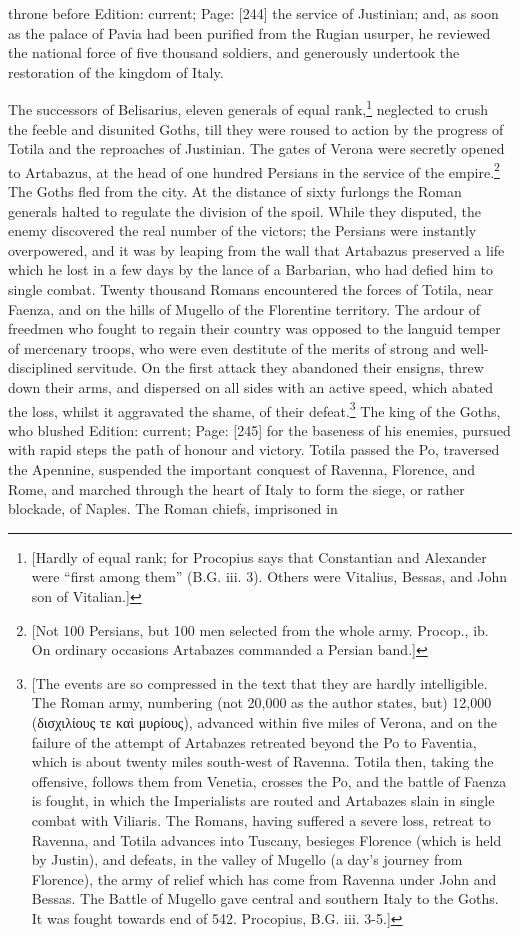 throne before Edition: current; Page: [244] the service of Justinian; and, as soon as the palace of Pavia had been purified from the Rugian usurper, he reviewed the national force of five thousand soldiers, and generously undertook the restoration of the kingdom of Italy.

The successors of Belisarius, eleven generals of equal rank,\footnote{[Hardly of equal rank; for Procopius says that Constantian and Alexander were \texthebrew{“}first among them\texthebrew{}” (B.G. iii. 3). Others were Vitalius, Bessas, and John son of Vitalian.]} neglected to crush the feeble and disunited Goths, till they were roused to action by the progress of Totila and the reproaches of Justinian. The gates of Verona were secretly opened to Artabazus, at the head of one hundred Persians in the service of the empire.\footnote{[Not 100 Persians, but 100 men selected from the whole army. Procop., ib. On ordinary occasions Artabazes commanded a Persian band.]} The Goths fled from the city. At the distance of sixty furlongs the Roman generals halted to regulate the division of the spoil. While they disputed, the enemy discovered the real number of the victors; the Persians were instantly overpowered, and it was by leaping from the wall that Artabazus preserved a life which he lost in a few days by the lance of a Barbarian, who had defied him to single combat. Twenty thousand Romans encountered the forces of Totila, near Faenza, and on the hills of Mugello of the Florentine territory. The ardour of freedmen who fought to regain their country was opposed to the languid temper of mercenary troops, who were even destitute of the merits of strong and well-disciplined servitude. On the first attack they abandoned their ensigns, threw down their arms, and dispersed on all sides with an active speed, which abated the loss, whilst it aggravated the shame, of their defeat.\footnote{[The events are so compressed in the text that they are hardly intelligible. The Roman army, numbering (not 20,000 as the author states, but) 12,000 (\textgreek{δισχιλίους τε κα\texthebrew{ὶ} μυρίους}), advanced within five miles of Verona, and on the failure of the attempt of Artabazes retreated beyond the Po to Faventia, which is about twenty miles south-west of Ravenna. Totila then, taking the offensive, follows them from Venetia, crosses the Po, and the battle of Faenza is fought, in which the Imperialists are routed and Artabazes slain in single combat with Viliaris. The Romans, having suffered a severe loss, retreat to Ravenna, and Totila advances into Tuscany, besieges Florence (which is held by Justin), and defeats, in the valley of Mugello (a day\texthebrew{}’s journey from Florence), the army of relief which has come from Ravenna under John and Bessas. The Battle of Mugello gave central and southern Italy to the Goths. It was fought towards end of 542. Procopius, B.G. iii. 3-5.]} The king of the Goths, who blushed Edition: current; Page: [245] for the baseness of his enemies, pursued with rapid steps the path of honour and victory. Totila passed the Po, traversed the Apennine, suspended the important conquest of Ravenna, Florence, and Rome, and marched through the heart of Italy to form the siege, or rather blockade, of Naples. The Roman chiefs, imprisoned in 